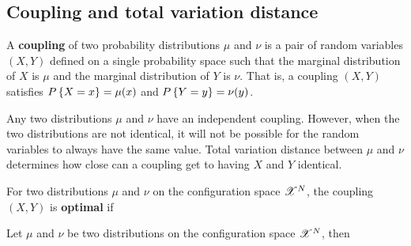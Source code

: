 \documentclass[letterpaper,english,10pt]{article}
\begin{document}
\subsection{Coupling and total variation distance}
\begin{defn}
A \textbf{coupling} of two probability distributions $\mu$ and $\nu$ is a pair of random variables $(X, Y)$ 
defined on a single probability space such that the marginal distribution of $X$ is $\mu$ and the marginal distribution of $Y$ is $\nu$. 
That is, a coupling $(X, Y)$ satisfies $P\left\{X = x\right\} = \mu(x)$ and $P\left\{Y = y\right\} = \nu(y)$. 
\end{defn}

Any two distributions $\mu$ and $\nu$ have an independent coupling. 
However, when the two distributions are not identical, 
it will not be possible for the random variables to always have the same value. 
Total variation distance between $\mu$ and $\nu$ determines how close can a coupling get to having $X$ and $Y$ identical. 
\begin{defn}
For two distributions $\mu$ and $\nu$ on the configuration space $\mathscr{X}^N$, 
the coupling $(X,Y)$ is \textbf{optimal} if  
\end{defn}
\begin{prop}
Let $\mu$ and $\nu$ be two distributions on the configuration space $\mathscr{X}^N$, then 
\end{prop}
\end{document}
